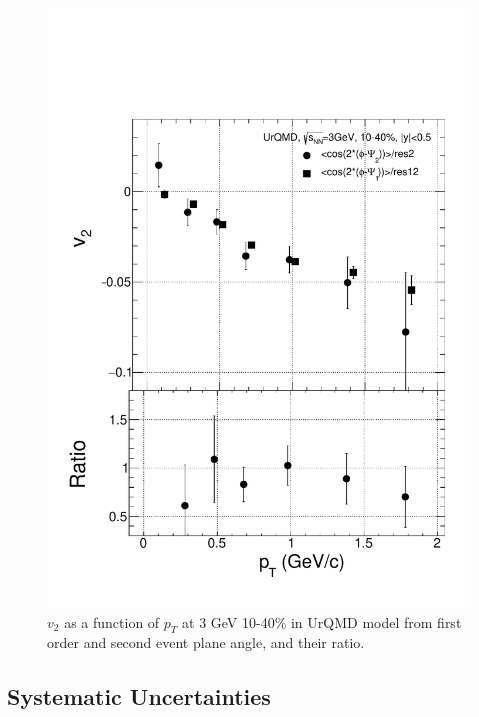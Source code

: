 \begin{figure}[h]
\includegraphics[scale=0.6]{chapter3/fig/second/v2pt_urqdm.pdf}
\caption{\label{v2pt_urqmd_com} $v_{2}$ as a function of $p_{T}$ at 3 GeV 10-40\% in UrQMD model from first order and second event plane angle, and their ratio.}
\end{figure}


\clearpage
\subsection{Systematic Uncertainties}

